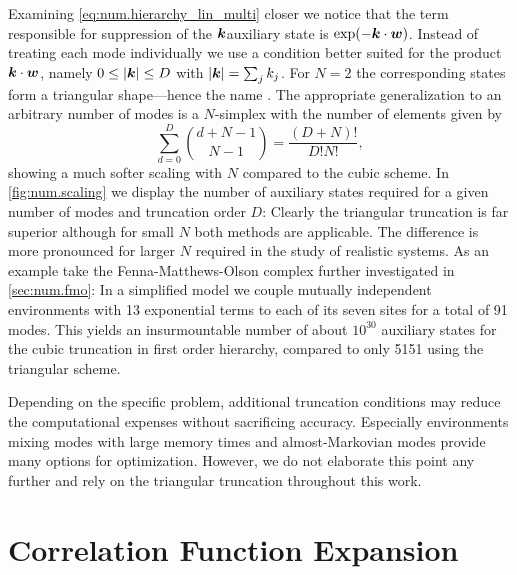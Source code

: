 Examining \autoref{eq:num.hierarchy_lin_multi} closer we notice that the term responsible for suppression of the $\boldsymbol{k}$\th auxiliary state is $\exp(-\kk \cdot \ww)$.
Instead of treating each mode individually we use a condition better suited for the product $\boldsymbol{k}\cdot\boldsymbol{w}$, namely $0 \le \vert \boldsymbol{k} \vert \le D$ with $\vert \boldsymbol{k} \vert = \sum_j k_j$.
For $N=2$ the corresponding states form a triangular shape---hence the name .
The appropriate generalization to an arbitrary number of modes is a $N$-simplex with the number of elements given by
\begin{equation}
  \sum_{d=0}^D {d + N - 1 \choose N - 1} = \frac{(D + N)!}{D!N!},
  \label{eq:num.triangular_scaling}
\end{equation}
showing a much softer scaling with $N$ compared to the cubic scheme.
In \autoref{fig:num.scaling} we display the number of auxiliary states required for a given number of modes and truncation order $D$:
Clearly the triangular truncation is far superior although for small $N$ both methods are applicable.
The difference is more pronounced for larger $N$ required in the study of realistic systems.
As an example take the Fenna-Matthews-Olson complex further investigated in \autoref{sec:num.fmo}:
In a simplified model we couple mutually independent environments with 13 exponential terms to each of its seven sites for a total of 91 modes.
This yields an insurmountable number of about $10^{30}$ auxiliary states for the cubic truncation in first order hierarchy, compared to only 5151 using the triangular scheme.

Depending on the specific problem, additional truncation conditions may reduce the computational expenses without sacrificing accuracy.
Especially environments mixing modes with large memory times and almost-Markovian modes provide many options for optimization.
However, we do not elaborate this point any further and rely on the triangular truncation throughout this work.

\section{Correlation Function Expansion}
\label{sec:num.expansion}
%

